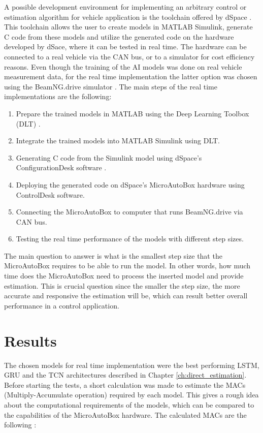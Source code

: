 A possible development environment for implementing an arbitrary control or estimation algorithm for vehicle application is the toolchain offered by dSpace \cite{dspace_tutorial} \cite{dspace_matlab} \cite{dspace_rt}. This toolchain allows the user to create models in MATLAB Simulink, generate C code from these models and utilize the generated code on the hardware developed by dSace, where it can be tested in real time. The hardware can be connected to a real vehicle via the CAN bus, or to a simulator for cost efficiency reasons. Even though the training of the AI models was done on real vehicle measurement data, for the real time implementation the latter option was chosen using the BeamNG.drive simulator \cite{beamng}. The main steps of the real time implementations are the following:
\begin{enumerate}
    \item Prepare the trained models in MATLAB using the Deep Learning Toolbox (DLT) \cite{matlab_dlt}.
    \item Integrate the trained models into MATLAB Simulink using DLT.
    \item Generating C code from the Simulink model using dSpace's ConfigurationDesk software \cite{dspace_configdesk}.
    \item Deploying the generated code on dSpace's MicroAutoBox \cite{dspace_microautobox} hardware using ControlDesk software.
    \item Connecting the MicroAutoBox to computer that runs BeamNG.drive via CAN bus.
    \item Testing the real time performance of the models with different step sizes.
\end{enumerate}

The main question to answer is what is the smallest step size that the MicroAutoBox requires to be able to run the model. In other words, how much time does the MicroAutoBox need to process the inserted model and provide estimation. This is crucial question since the smaller the step size, the more accurate and responsive the estimation will be, which can result better overall performance in a control application.  

\section{Results}

The chosen models for real time implementation were the best performing LSTM, GRU and the TCN architectures described in Chapter \ref{ch:direct_estimation}. Before starting the tests, a short calculation was made to estimate the MACs (Multiply-Accumulate operation) required by each model. This gives a rough idea about the computational requirements of the models, which can be compared to the capabilities of the MicroAutoBox hardware. The calculated MACs are the following \cite{mac_calculation}:

